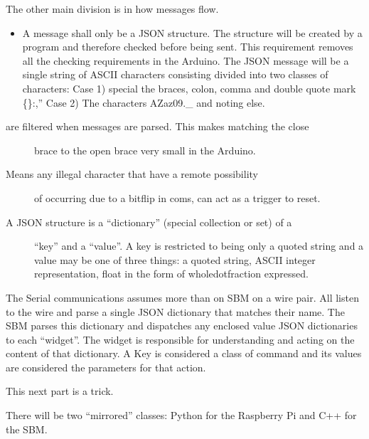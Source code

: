 \documentclass[letterpaper,10pt,english,openany,oneside]{sphinxmanual}
\begin{document}
\sphinxAtStartPar
The other main division is in how messages flow.
\begin{itemize}
\item {} 
\sphinxAtStartPar
A message shall only be a JSON structure. The structure will be
created by a program and therefore checked before being sent. This
requirement removes all the checking requirements in the
Arduino. The JSON message will be a single string of ASCII
characters consisting divided into two classes of characters: Case
1) special \sphinxhyphen{} the braces, colon, comma and double quote mark \{\}:,”
Case 2) The characters A\sphinxhyphen{}Za\sphinxhyphen{}z0\sphinxhyphen{}9.\_ and noting else.

\end{itemize}
\begin{description}
\item[{ are filtered when messages are parsed. This makes matching the close}] \leavevmode
\sphinxAtStartPar
brace to the open brace very small in the Arduino.

\item[{ Means any illegal character \textendash{} that have a remote possibility}] \leavevmode
\sphinxAtStartPar
of occurring due to a bit\sphinxhyphen{}flip in coms, can act as a trigger to reset.

\item[{A JSON structure is a “dictionary” (special collection or set) of a}] \leavevmode
\sphinxAtStartPar
“key” and a “value”. A key is restricted to being only a quoted
string and a value may be one of three things: a quoted string,
ASCII integer representation, float in the form of
whole\sphinxhyphen{}dot\sphinxhyphen{}fraction expressed.

\end{description}

\sphinxAtStartPar
The Serial communications assumes more than on SBM on a wire pair.
All listen to the wire and parse a single JSON dictionary that matches
their name. The SBM parses this dictionary and dispatches any enclosed
value JSON dictionaries to each “widget”. The widget is responsible
for understanding and acting on the content of that dictionary.
A Key is considered a class of command and its values are considered
the parameters for that action.

\sphinxAtStartPar
This next part is a trick.

\sphinxAtStartPar
There will be two “mirrored” classes: Python for the Raspberry Pi
and C++ for the SBM.
\end{document}
